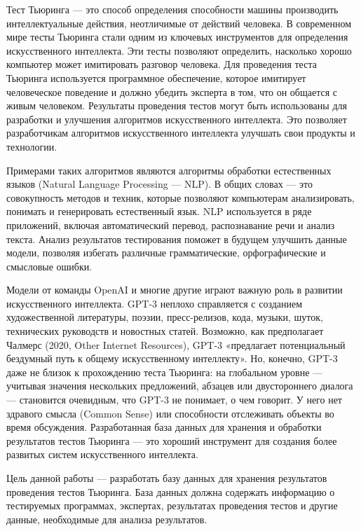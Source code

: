 
Тест Тьюринга --- это способ определения способности машины производить интеллектуальные действия, неотличимые от действий человека. В современном мире тесты Тьюринга стали одним из ключевых инструментов для определения искусственного интеллекта. Эти тесты позволяют определить, насколько хорошо компьютер может имитировать разговор человека.
Для проведения теста Тьюринга используется программное обеспечение, которое имитирует человеческое поведение и должно убедить эксперта в том, что он общается с живым человеком. Результаты проведения тестов могут быть использованы для разработки и улучшения алгоритмов искусственного интеллекта. Это позволяет разработчикам алгоритмов искусственного интеллекта улучшать свои продукты и технологии.

Примерами таких алгоритмов являются алгоритмы обработки естественных языков (Natural Language Processing --- NLP). В общих словах --- это совокупность методов и техник, которые позволяют компьютерам анализировать, понимать и генерировать естественный язык. NLP используется в ряде приложений, включая автоматический перевод, распознавание речи и анализ текста. Анализ результатов тестирования поможет в будущем улучшить данные модели, позволяя избегать различные грамматические, орфографические и смысловые ошибки. 

Модели от команды OpenAI и многие другие играют важную роль в развитии искусственного интеллекта. GPT-3 неплохо справляется с созданием художественной литературы, поэзии, пресс-релизов, кода, музыки, шуток, технических руководств и новостных статей. Возможно, как предполагает Чалмерс (2020, Other Internet Resources), GPT-3 «предлагает потенциальный бездумный путь к общему искусственному интеллекту». Но, конечно, GPT-3 даже не близок к прохождению теста Тьюринга: на глобальном уровне — учитывая значения нескольких предложений, абзацев или двустороннего диалога — становится очевидным, что GPT-3 не понимает, о чем говорит. У него нет здравого смысла (Common Sense) или способности отслеживать объекты во время обсуждения. Разработанная база данных для хранения и обработки результатов тестов Тьюринга --- это хороший инструмент для создания более развитых систем искусственного интеллекта. 

Цель данной работы --- разработать базу данных для хранения результатов проведения тестов Тьюринга. База данных должна содержать информацию о тестируемых программах, экспертах, результатах проведения тестов и другие данные, необходимые для анализа результатов.

